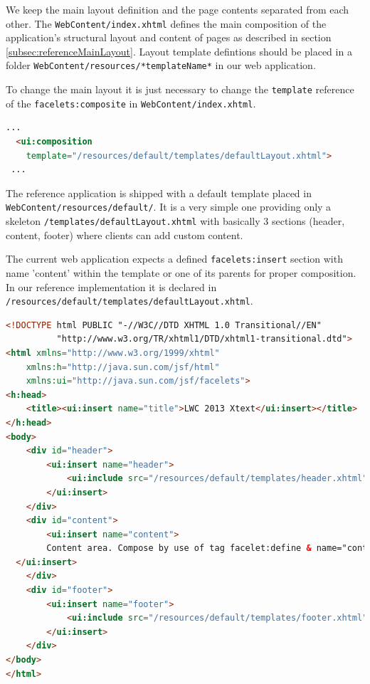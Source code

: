 We keep the main layout definition and the page contents separated from each
other. The \texttt{WebContent/index.xhtml} defines the main composition of the
application's structural layout and content of pages as described in section
\ref{subsec:referenceMainLayout}. Layout template defintions should be placed in
a folder \texttt{WebContent/resources/*templateName*} in our web
application.

To change the main layout it is just necessary to change the \texttt{template}
reference of the \newline\texttt{facelets:composite} in
\texttt{WebContent/index.xhtml}.\newline

\begin{lstlisting}[language=HTML]
 ...
  <ui:composition
    template="/resources/default/templates/defaultLayout.xhtml">
 ...
\end{lstlisting}

The reference application is shipped with a default template placed in \newline
\texttt{WebContent/resources/default/}. It is a very simple one
providing only a skeleton \newline \texttt{/templates/defaultLayout.xhtml} with
basically 3 sections (header, content, footer) where clients can add custom
content.

The current web application expects a defined \texttt{facelets:insert}
section with name 'content' within the template or one of its parents for proper
composition. In our reference implementation it is declared in
\texttt{/resources/default/templates/defaultLayout.xhtml}.

\begin{lstlisting}[language=HTML]
<!DOCTYPE html PUBLIC "-//W3C//DTD XHTML 1.0 Transitional//EN" 
          "http://www.w3.org/TR/xhtml1/DTD/xhtml1-transitional.dtd">
<html xmlns="http://www.w3.org/1999/xhtml"
	xmlns:h="http://java.sun.com/jsf/html"
	xmlns:ui="http://java.sun.com/jsf/facelets">
<h:head>
	<title><ui:insert name="title">LWC 2013 Xtext</ui:insert></title>
</h:head>
<body>
	<div id="header">
		<ui:insert name="header">
			<ui:include src="/resources/default/templates/header.xhtml" />
		</ui:insert>
	</div>
	<div id="content">
		<ui:insert name="content">
    	Content area. Compose by use of tag facelet:define & name="content".
  </ui:insert>
	</div>
	<div id="footer">
		<ui:insert name="footer">
			<ui:include src="/resources/default/templates/footer.xhtml" />
		</ui:insert>
	</div>
</body>
</html>
\end{lstlisting}


